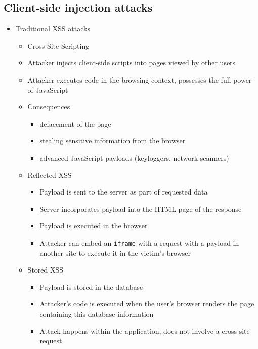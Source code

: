 \documentclass[12pt,titlepage,a4paper]{report}
\begin{document}
			\subsection{Client-side injection attacks}
			\begin{itemize}
				\item Traditional XSS attacks
				\begin{itemize}
					\item Cross-Site Scripting
					\item Attacker injects client-side scripts into pages viewed by other users
					\item Attacker executes code in the browsing context, possesses the full power of JavaScript
					\item Consequences
					\begin{itemize}
						\item defacement of the page
						\item stealing sensitive information from the browser
						\item advanced JavaScript payloads (keyloggers, network scanners)
					\end{itemize}
					\item Reflected XSS
					\begin{itemize}
						\item Payload is sent to the server as part of requested data
						\item Server incorporates payload into the HTML page of the response
						\item Payload is executed in the browser
						\item Attacker can embed an \texttt{iframe} with a request with a payload in another site to execute it in the victim's browser
					\end{itemize}
					\item Stored XSS
					\begin{itemize}
						\item Payload is stored in the database
						\item Attacker's code is executed when the user's browser renders the page containing this database information
						\item Attack happens within the application, does not involve a cross-site request
					\end{itemize}
				\end{itemize}
			

\end{itemize}
\end{document}
